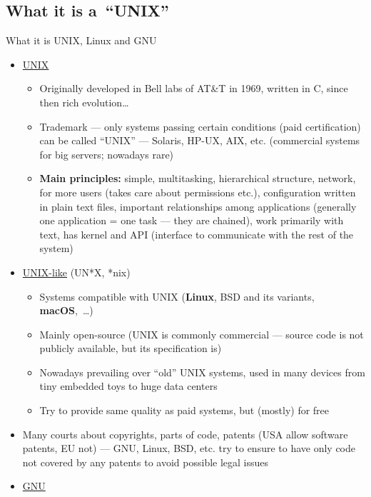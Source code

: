 \documentclass[compress, xelatex, 11pt, xcolor=svgnames, aspectratio=169, url={hyphens, lowtilde}]{beamer}
\begin{document}
\subsection{What it is a~\enquote{UNIX}}

\begin{frame}[allowframebreaks]{What it is UNIX, Linux and GNU}
	\begin{itemize}
		\item \href{https://en.wikipedia.org/wiki/Unix}{UNIX}
		\begin{itemize}
			\item Originally developed in Bell labs of AT\&T in 1969, written in C, since then rich evolution\ldots
			\item Trademark --- only systems passing certain conditions (paid certification) can be called \enquote{UNIX} --- Solaris, HP-UX, AIX, etc. (commercial systems for big servers; nowadays rare)
			\item \textbf{Main principles:} simple, multitasking, hierarchical structure, network, for more users (takes care about permissions etc.), configuration written in plain text files, important relationships among applications (generally one application = one task --- they are chained), work primarily with text, has kernel and API (interface to communicate with the rest of the system)
		\end{itemize}
		\item \href{https://en.wikipedia.org/wiki/Unix-like}{UNIX-like} (UN*X, *nix)
		\begin{itemize}
			\item Systems compatible with UNIX (\textbf{Linux}, BSD and its variants, \textbf{macOS},~\ldots)
			\item Mainly open-source (UNIX is commonly commercial --- source code is not publicly available, but its specification is)
			\item Nowadays prevailing over \enquote{old} UNIX systems, used in many devices from tiny embedded toys to huge data centers
			\item Try to provide same quality as paid systems, but (mostly) for free
		\end{itemize}
		\item Many courts about copyrights, parts of code, patents (USA allow software patents, EU not) --- GNU, Linux, BSD, etc. try to ensure to have only code not covered by any patents to avoid possible legal issues
		\item \href{https://www.gnu.org/}{GNU}
		\begin{itemize}

\end{itemize}
\end{itemize}
\end{frame}
\end{document}
